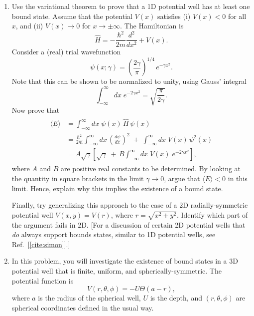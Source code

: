 \documentclass[prx,12pt]{revtex4-2}
\begin{document}
\begin{enumerate}
\item Use the variational theorem to prove that a 1D potential well
  has at least one bound state.  Assume that the potential $V(x)$
  satisfies (i) $V(x) < 0$ for all $x$, and (ii) $V(x)\rightarrow 0$
  for $x\rightarrow\pm\infty$.  The Hamiltonian is
  \begin{equation}
    \hat{H} = - \frac{\hbar^2}{2m} \frac{d^2}{dx^2} + V(x).
  \end{equation}
  Consider a (real) trial wavefunction
  \begin{equation}
    \psi(x;\gamma) = \left(\frac{2\gamma}{\pi}\right)^{1/4} \,e^{-\gamma x^2}.
  \end{equation}
  Note that this can be shown to be normalized to unity, using Gauss'
  integral
  \begin{equation}
    \int_{-\infty}^{\infty} dx\; e^{-2\gamma x^2} = \sqrt{\frac{\pi}{2\gamma}}.
  \end{equation}
  Now prove that
  \begin{align}
    \begin{aligned}
      \langle E \rangle &= \int_{-\infty}^\infty dx \; \psi(x) \, \hat{H} \,\psi(x) \\
      &= \frac{\hbar^2}{2m} \int_{-\infty}^\infty dx\, \left(\frac{d\psi}{dx}\right)^2
      \;+\; \int_{-\infty}^\infty dx\; V(x) \,\psi^2(x) \\
      &= A\sqrt{\gamma} \left[\sqrt{\gamma}
        \;+\, B \int_{-\infty}^\infty dx\; V(x) \;e^{-2\gamma x^2}
        \right],
    \end{aligned}
  \end{align}
  where $A$ and $B$ are positive real constants to be determined.  By
  looking at the quantity in square brackets in the limit $\gamma
  \rightarrow 0$, argue that $\langle E \rangle < 0$ in this limit.
  Hence, explain why this implies the existence of a bound state.

  Finally, try generalizing this approach to the case of a 2D
  radially-symmetric potential well $V(x,y) = V(r)$, where $r =
  \sqrt{x^2+y^2}$.  Identify which part of the argument fails in 2D.
       [For a discussion of certain 2D potential wells that
         \textit{do} always support bounds states, similar to 1D
         potential wells, see Ref.~[\ref{cite:simon}].]
  \label{ex:boundstate}

\item In this problem, you will investigate the existence of bound
  states in a 3D potential well that is finite, uniform, and
  spherically-symmetric.  The potential function is
  \begin{equation}
    V(r,\theta,\phi) = -U\Theta(a-r),
  \end{equation}
  where $a$ is the radius of the spherical well, $U$ is the depth,
  and $(r,\theta,\phi)$ are spherical coordinates defined in the usual
  way.


\end{enumerate}
\end{document}
